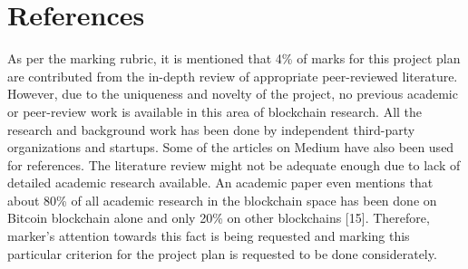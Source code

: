 \documentclass[a4paper,twoside,phd]{BYUPhys}
\begin{document}
\section{References}
As per the marking rubric, it is mentioned that 4\% of marks for this project plan are contributed from the in-depth review of appropriate peer-reviewed literature. However, due to the uniqueness and novelty of the project, no previous academic or peer-review work is available in this area of blockchain research. All the research and background work has been done by independent third-party organizations and startups. Some of the articles on Medium have also been used for references. The literature review might not be adequate enough due to lack of detailed academic research available. An academic paper even mentions that about 80\% of all academic research in the blockchain space has been done on Bitcoin blockchain alone and only 20\% on other blockchains [15]. Therefore, marker’s attention towards this fact is being requested and marking this particular criterion for the project plan is requested to be done considerately.
\end{document}
